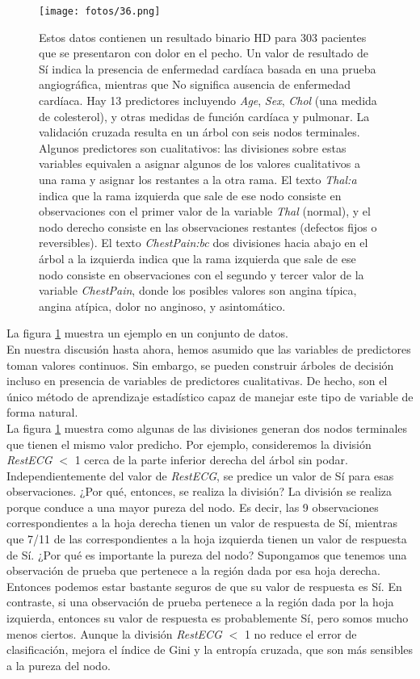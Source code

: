 \begin{figure}[h]
\centering
\texttt{[image: fotos/36.png]}
\caption{Estos datos contienen un resultado binario HD para 303 pacientes que se presentaron con dolor en el pecho. Un valor de resultado de Sí indica la presencia de enfermedad cardíaca basada en una prueba angiográfica, mientras que No significa ausencia de enfermedad cardíaca. Hay 13 predictores incluyendo \textit{Age}, \textit{Sex}, \textit{Chol} (una medida de colesterol), y otras medidas de función cardíaca y pulmonar. La validación cruzada resulta en un árbol con seis nodos terminales. Algunos predictores son cualitativos: las divisiones sobre estas variables equivalen a asignar algunos de los valores cualitativos a una rama y asignar los restantes a la otra rama. El texto \textit{Thal:a} indica que la rama izquierda que sale de ese nodo consiste en observaciones con el primer valor de la variable \textit{Thal} (normal), y el nodo derecho
consiste en las observaciones restantes (defectos fijos o reversibles). El texto \textit{ChestPain:bc} dos divisiones hacia abajo en el árbol a la izquierda indica que la rama izquierda que sale de ese nodo consiste en observaciones con el segundo y tercer valor de la variable \textit{ChestPain}, donde los posibles valores son angina típica, angina atípica, dolor no anginoso, y asintomático.}
\label{fig:6.7}
\end{figure}

La figura \ref{fig:6.7} muestra un ejemplo en un conjunto de datos. \\

En nuestra discusión hasta ahora, hemos asumido que las variables de predictores toman valores continuos. Sin embargo, se pueden construir árboles de decisión incluso en presencia de variables de predictores cualitativas. De hecho, son el único método de aprendizaje estadístico capaz de manejar este tipo de variable de forma natural. \\

La figura \ref{fig:6.7} muestra como algunas de las divisiones generan dos nodos terminales que tienen el mismo valor predicho. Por ejemplo, consideremos la división \textit{RestECG} $<$ 1 cerca de la parte inferior derecha del árbol sin podar. Independientemente del valor de \textit{RestECG}, se predice un valor de Sí para esas observaciones. ¿Por qué, entonces, se realiza la división? La división se realiza porque conduce a una mayor pureza del nodo. Es decir, las 9 observaciones correspondientes a la hoja derecha tienen un valor de respuesta de Sí, mientras que 7/11 de las correspondientes a la hoja izquierda tienen un valor de respuesta de Sí. ¿Por qué es importante la pureza del nodo? Supongamos que tenemos una observación de prueba que pertenece a la región dada por esa hoja derecha. Entonces podemos estar bastante seguros de que su valor de respuesta es Sí. En contraste, si una observación de prueba pertenece a la región dada por la hoja izquierda, entonces su valor de respuesta es probablemente Sí, pero somos mucho menos ciertos. Aunque la división \textit{RestECG} $<$ 1 no reduce el error de clasificación, mejora el índice de Gini y la entropía cruzada, que son más sensibles a la pureza del nodo.

